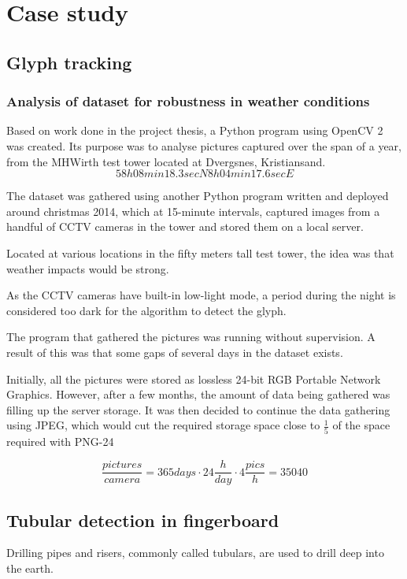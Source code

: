 \chapter{Case study}
\section{Glyph tracking}
\subsection{Analysis of dataset for robustness in weather conditions}
Based on work done in the project thesis, a Python program using OpenCV 2 was created. Its purpose was to analyse pictures captured over the span of a year, from the MHWirth test tower located at Dvergsnes, Kristiansand.
\begin{equation}
58h 08min 18.3sec N 8h 04min 17.6sec E
\end{equation}

The dataset was gathered using another Python program written and deployed around christmas 2014, which at 15-minute intervals, captured images from a handful of CCTV cameras in the tower and stored them on a local server.

Located at various locations in the fifty meters tall test tower, the idea was that weather impacts would be strong.

As the CCTV cameras have built-in low-light mode, a period during the night is considered too dark for the algorithm to detect the glyph.

The program that gathered the pictures was running without supervision. A result of this was that some gaps of several days in the dataset exists.

Initially, all the pictures were stored as lossless 24-bit RGB Portable Network Graphics. However, after a few months, the amount of data being gathered was filling up the server storage. It was then decided to continue the data gathering using JPEG, which would cut the required storage space close to $\frac{1}{5}$ of the space required with PNG-24

\begin{equation}
\frac{pictures}{camera}=365 days\cdot 24\frac{h}{day}\cdot 4\frac{pics}{h}=35040
\end{equation}

\section{Tubular detection in fingerboard}
Drilling pipes and risers, commonly called tubulars, are used to drill deep into the earth.

